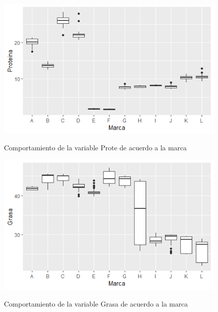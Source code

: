 \documentclass[pdf]{beamer}
\begin{document}
\begin{frame}
\begin{figure}[h]
\centering
\includegraphics[scale=1]{images/prote.png} 
\label{i4}
\caption{Comportamiento de la variable Prote de acuerdo a la marca}
\end{figure}
\end{frame}


\begin{frame}
\begin{figure}[h]
\centering
\includegraphics[scale=1]{images/grasa.png} 
\label{i5}
\caption{Comportamiento de la variable Grasa de acuerdo a la marca}
\end{figure}
\end{frame}
\end{document}
